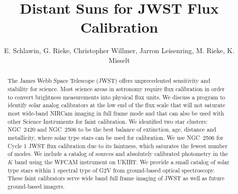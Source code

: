 \documentclass{aastex6}
\begin{document}

\title{Distant Suns for JWST Flux Calibration}


\author{E. Schlawin, G. Rieke, Christopher Willmer, Jarron Leisenring, M. Rieke, K. Misselt}




\begin{abstract}
The James Webb Space Telescope (JWST) offers unprecedented sensitivity and stability for science.
Most science areas in astronomy require flux calibration in order to convert brightness measurements into physical flux units.
We discuss a program to identify solar analog calibrators at the low end of the flux scale that will not saturate most wide-band NIRCam imaging in full frame mode and that can also be used with other Science Instruments for faint calibration.
We identified two star clusters: NGC~2420 and NGC~2506 to be the best balance of extinction, age, distance and metallicity, where solar type stars can be used for calibration.
We use NGC~2506 for Cycle 1 JWST flux calibration due to its faintness, which saturates the fewest number of modes.
We include a catalog of sources and absolutely calibrated photometry in the $K$ band using the WFCAM instrument on UKIRT.
We provide a small catalog of solar type stars within 1 spectral type of G2V from ground-based optical spectroscopy.
These faint calibrators serve wide band full frame imaging of JWST as well as future ground-based imagers.
\end{abstract}
\end{document}
